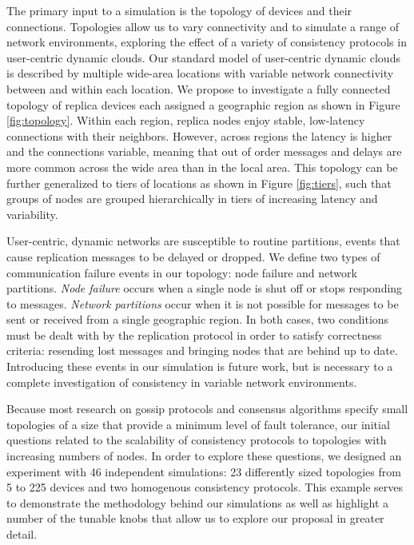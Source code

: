 \documentclass{article}
\begin{document}
The primary input to a simulation is the topology of devices and their connections. Topologies allow us to vary connectivity and to simulate a range of network environments, exploring the effect of a variety of consistency protocols in user-centric dynamic clouds. Our standard model of user-centric dynamic clouds is described by multiple wide-area locations with variable network connectivity between and within each location. We propose to investigate a fully connected topology of replica devices each assigned a geographic region as shown in Figure \ref{fig:topology}. Within each region, replica nodes enjoy stable, low-latency connections with their neighbors. However, across regions the latency is higher and the connections variable, meaning that out of order messages and delays are more common across the wide area than in the local area. This topology can be further generalized to tiers of locations as shown in Figure \ref{fig:tiers}, such that groups of nodes are grouped hierarchically in tiers of increasing latency and variability.

User-centric, dynamic networks are susceptible to routine partitions, events that cause replication messages to be delayed or dropped. We define two types of communication failure events in our topology: node failure and network partitions. \textit{Node failure} occurs when a single node is shut off or stops responding to messages. \textit{Network partitions} occur when it is not possible for messages to be sent or received from a single geographic region. In both cases, two conditions must be dealt with by the replication protocol in order to satisfy correctness criteria: resending lost messages and bringing nodes that are behind up to date. Introducing these events in our simulation is future work, but is necessary to a complete investigation of consistency in variable network environments.

Because most research on gossip protocols and consensus algorithms specify small topologies of a size that provide a minimum level of fault tolerance, our initial questions related to the scalability of consistency protocols to topologies with increasing numbers of nodes. In order to explore these questions, we designed an experiment with 46 independent simulations: 23 differently sized topologies from 5 to 225 devices and two homogenous consistency protocols. This example serves to demonstrate the methodology behind our simulations as well as highlight a number of the tunable knobs that allow us to explore our proposal in greater detail.
\end{document}
